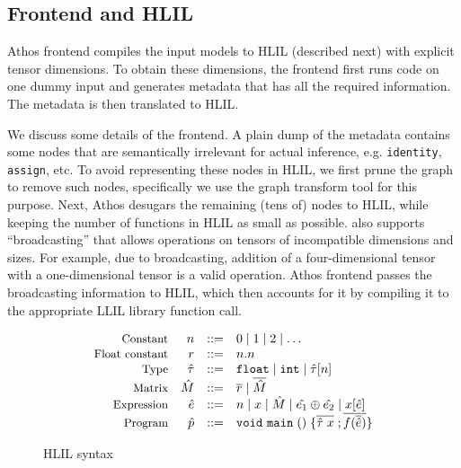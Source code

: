 \subsection{Frontend and HLIL}
\label{subsec:athosfrontend}

Athos frontend compiles the input \tensorflow models to HLIL (described
next) with explicit tensor dimensions. To obtain these dimensions,
the frontend first runs \tensorflow code on one dummy input and
generates \tensorflow metadata that has all the required information.
The metadata is then translated to HLIL.

We discuss some details of the frontend.
A plain dump of  the \tensorflow metadata contains some nodes that 
are semantically irrelevant for actual inference,
e.g. {\tt identity}, {\tt assign}, etc. To avoid representing these
nodes in HLIL,
we first prune the \tensorflow graph to remove such nodes,
specifically we use the \tensorflow graph transform tool
\cite{tfGraphTransformTool} for this purpose. Next, Athos desugars the remaining (tens of) \tensorflow nodes  to HLIL, while keeping the number of functions in HLIL as small
as possible. \tensorflow also supports
``broadcasting'' \cite{tensorflowbroadcasting} that allows operations
on tensors of incompatible dimensions and sizes. For example, due to
broadcasting, addition of a four-dimensional tensor with a one-dimensional tensor is a valid operation. Athos frontend
passes the broadcasting information to HLIL,
which then accounts for it by compiling it to the appropriate LLIL
library function call.



\begin{figure}[htp]
  \footnotesize
  \[
  \begin{array}{rrcl}
    \text{\small{Constant}} & n & ::= & 0 \mid 1 \mid 2 \mid \ldots\\
    \text{\small{Float constant}} & r & ::= & n.n\\
    \text{\small{Type}} & \hat{\tau} &::=& {\mathtt{float}} \mid {\ensuremath{\mathtt{int}}} \mid \hat{\tau}[n] \\
    \text{\small{Matrix}} & \hat{M} & ::= & \overline{r} \mid \overline{\hat{M}}\\
    \text{\small{Expression}} & \hat{e} &::=& n \mid x \mid \hat{M} \mid \hat{e_1} \oplus \hat{e_2} \mid x[\hat{e}] \\
    \text{\small{Program}} & \hat{p} & ::= &{\mathtt{void}}\ {\mathtt{main}}\;()\;\{\overline{\hat{\tau}\;x}\;;\overline{f(\overline{\hat{e}})}\}
  \end{array}
  \]
\caption{HLIL syntax}
\label{fig:hil}
\end{figure}

